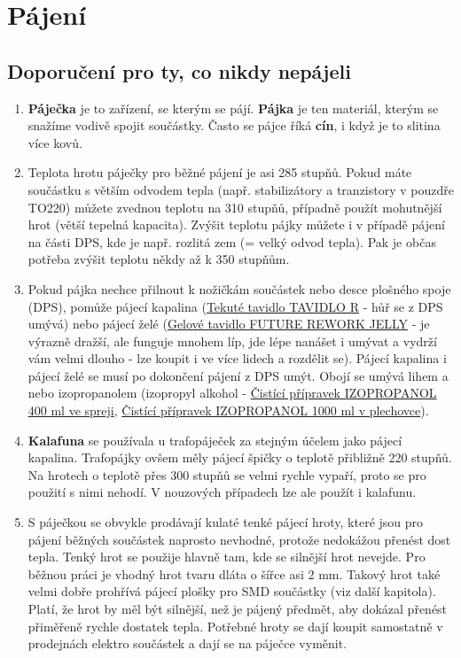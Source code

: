 \section{Pájení} 

\subsection{Doporučení pro ty, co nikdy nepájeli}

\begin{enumerate}
\item {\bf  Páječka}  je to zařízení, se kterým se pájí. {\bf Pájka}  je ten materiál, kterým se snažíme vodivě spojit součástky. Často se pájce říká {\bf cín},  i když je to slitina více kovů. 
\item Teplota hrotu páječky pro běžné pájení je asi 285 stupňů. Pokud máte součástku s větším odvodem tepla (např. stabilizátory a tranzistory v pouzdře TO220) můžete zvednou teplotu na 310 stupňů, případně použít mohutnější hrot (větší tepelná kapacita). Zvýšit teplotu pájky můžete i v případě pájení na části DPS, kde je např. rozlitá zem (= velký odvod tepla). Pak je občas potřeba zvýšit teplotu někdy až k 350 stupňům.
\item Pokud pájka nechce přilnout k nožičkám součástek nebo desce plošného spoje (DPS), pomůže pájecí kapalina (\href{https://www.gme.cz/tavidlo-r-30ml}{Tekuté tavidlo TAVIDLO R} - hůř se z DPS umývá)
nebo pájecí želé (\href{https://www.gme.cz/gelove-tavidlo-future-rework-jelly-30-g}{Gelové tavidlo FUTURE REWORK JELLY} - je výrazně dražší, ale funguje mnohem líp, jde lépe  nanášet i umývat a vydrží vám velmi dlouho - lze koupit i ve více lidech a rozdělit se). Pájecí kapalina i pájecí želé se musí po dokončení pájení z DPS umýt. Obojí  se umývá lihem a nebo izopropanolem (izopropyl alkohol - \href{https://www.gme.cz/cistici-pripravek-izopropanol-400ml}{Čistící přípravek IZOPROPANOL 400 ml ve spreji}, \href{https://www.gme.cz/cistici-pripravek-izopropanol-1000ml}{Čistící přípravek IZOPROPANOL 1000 ml v plechovce}). 
\item {\bf Kalafuna}  se používala u trafopáječek za stejným účelem jako pájecí kapalina. Trafopájky ovšem měly pájecí špičky o teplotě přibližně 220 stupňů. %
Na hrotech o teplotě přes 300 stupňů se velmi rychle vypaří, proto se pro použití s nimi nehodí. V nouzových případech lze ale použít i kalafunu.
\item S páječkou se obvykle prodávají kulaté tenké pájecí hroty, které jsou pro pájení běžných součástek naprosto nevhodné, protože nedokážou přenést dost tepla. Tenký hrot se použije hlavně tam, kde se silnější hrot nevejde. Pro běžnou práci je vhodný hrot tvaru dláta o šířce asi 2 mm. Takový hrot také velmi dobře prohřívá pájecí plošky pro SMD součástky (viz další kapitola). Platí, že hrot by měl být silnější, než je pájený předmět, aby dokázal přenést přiměřeně rychle dostatek tepla. Potřebné hroty se dají koupit samostatně v prodejnách elektro součástek a dají se na páječce vyměnit. 

\end{enumerate}
